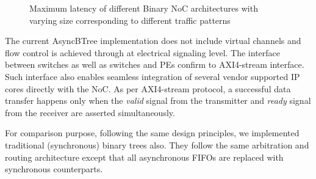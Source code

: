 \begin{figure}[t]
\centering     %
{}
\caption{Maximum latency of different Binary NoC architectures with varying size corresponding to different traffic patterns}
\label{fig:latency}
\end{figure}


The current AsyncBTree implementation does not include virtual channels and flow control is achieved through at electrical signaling level.
The interface between switches as well as switches and PEs confirm to AXI4-stream interface.
Such interface also enables seamless integration of several vendor supported IP cores directly with the NoC.
As per AXI4-stream protocol, a successful data transfer happens only when the \emph{valid} signal from the transmitter and \emph{ready} signal from the receiver are asserted simultaneously.

For comparison purpose, following the same design principles, we implemented traditional (synchronous) binary trees also.
They follow the same arbitration and routing architecture except that all asynchronous FIFOs are replaced with synchronous counterparts.